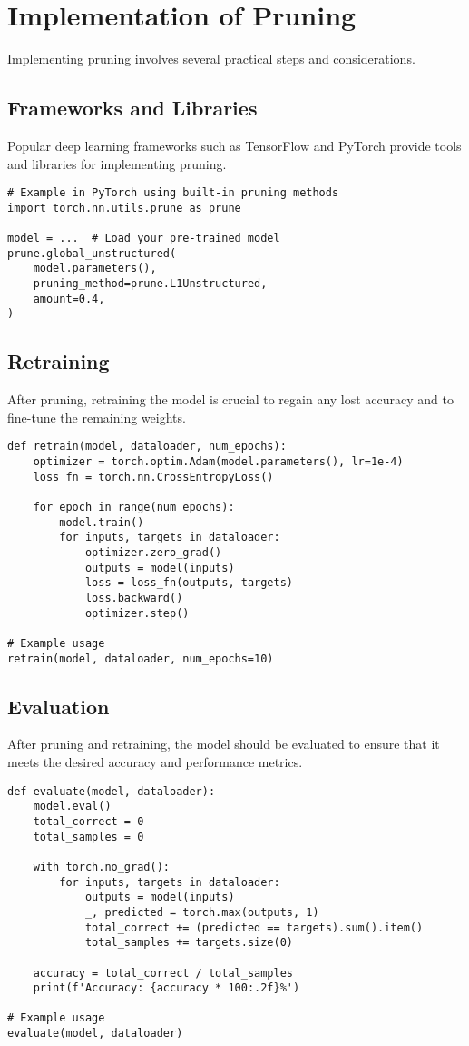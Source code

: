 \section{Implementation of Pruning}
Implementing pruning involves several practical steps and considerations.

\subsection{Frameworks and Libraries}
Popular deep learning frameworks such as TensorFlow and PyTorch provide tools and libraries for implementing pruning.

\begin{verbatim}
# Example in PyTorch using built-in pruning methods
import torch.nn.utils.prune as prune

model = ...  # Load your pre-trained model
prune.global_unstructured(
    model.parameters(),
    pruning_method=prune.L1Unstructured,
    amount=0.4,
)
\end{verbatim}

\subsection{Retraining}
After pruning, retraining the model is crucial to regain any lost accuracy and to fine-tune the remaining weights.

\begin{verbatim}
def retrain(model, dataloader, num_epochs):
    optimizer = torch.optim.Adam(model.parameters(), lr=1e-4)
    loss_fn = torch.nn.CrossEntropyLoss()

    for epoch in range(num_epochs):
        model.train()
        for inputs, targets in dataloader:
            optimizer.zero_grad()
            outputs = model(inputs)
            loss = loss_fn(outputs, targets)
            loss.backward()
            optimizer.step()

# Example usage
retrain(model, dataloader, num_epochs=10)
\end{verbatim}

\subsection{Evaluation}
After pruning and retraining, the model should be evaluated to ensure that it meets the desired accuracy and performance metrics.

\begin{verbatim}
def evaluate(model, dataloader):
    model.eval()
    total_correct = 0
    total_samples = 0

    with torch.no_grad():
        for inputs, targets in dataloader:
            outputs = model(inputs)
            _, predicted = torch.max(outputs, 1)
            total_correct += (predicted == targets).sum().item()
            total_samples += targets.size(0)

    accuracy = total_correct / total_samples
    print(f'Accuracy: {accuracy * 100:.2f}%')

# Example usage
evaluate(model, dataloader)
\end{verbatim}

